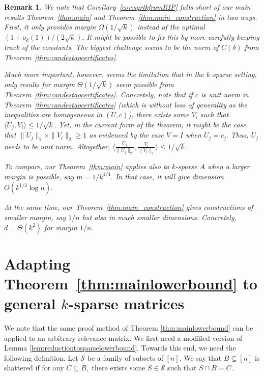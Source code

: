 \documentclass[preprint]{article}
\newtheorem{remark}{Remark}[]
\begin{document}
\begin{remark}
\label{rmk:candestaoinsufficient}
We note that Corollary~\ref{cor:sqrtkfromRIP} falls short of our main results Theorem~\ref{thm:main} and Theorem~\ref{thm:main_construction} in two ways. First, it only provides margin
$\Omega(1/\sqrt{k})$ instead of the optimal $(1+o_k(1))/(2\sqrt{k}).$ It might be possible to fix this by more 
carefully keeping track of the constants. The biggest challenge seems to be the norm of $C(\delta)$ from Theorem~\ref{thm:candestaocertificates}. 

Much more important, however, seems the limitation that in the $k$-sparse setting, only results for margin $\Theta(1/\sqrt{k})$ seem possible from Theorem~\ref{thm:candestaocertificates}. Concretely, 
note that if $c$ is unit norm in Theorem~\ref{thm:candestaocertificates} (which is without loss of generality as the inequalities are homogeneous in $(U,c)$), there exists some $V_i$ such that $\langle U_j, V_i\rangle \le 1/\sqrt{k}.$ Yet, in the current form of the theorem, it might be the case that $\|U_j\|_2\times \|V_i\|_2\ge 1$ as evidenced by the case $V =I$ when $U_j = c_j.$ Thus, $U_j$ needs to be unit norm. Altogether, 
$\langle \frac{U_j}{\|U_j\|_2}, \frac{V_i}{\|V_i\|_2}\rangle \le 1/\sqrt{k}.$ 

To compare, our Theorem~\ref{thm:main} applies also to $k$-sparse $A$ when a larger margin is possible, say $m = 1/k^{1/4}.$ In that case, it will give dimension $O(k^{1/2}\log n).$

At the same time, our Theorem~\ref{thm:main_construction} gives constructions of smaller margin, say $1/n$ but also in much smaller dimensions. Concretely,  $d = \Theta(k^2)$ for margin $1/n.$
\end{remark}






\section{Adapting \texorpdfstring{Theorem~\ref{thm:mainlowerbound}}{Theorem 1.2} to general 
\texorpdfstring{$k$}{k}-sparse matrices}
\label{sec:LowerBoundBeyondnchoosek}


We note that the same proof method of Theorem \ref{thm:mainlowerbound} can be applied to an arbitrary relevance matrix. We first need a modified version of Lemma \ref{lem:reductiontosparselowerbound}. Towards this end, we need the following definition. Let $\mathcal{S}$ be a family of subsets of $[n].$ We say that $B\subseteq [n]$ is shattered if for any $C\subseteq B,$ there exists some $S\in \mathcal{S}$ such that $S\cap B = C.$ 
\end{document}
